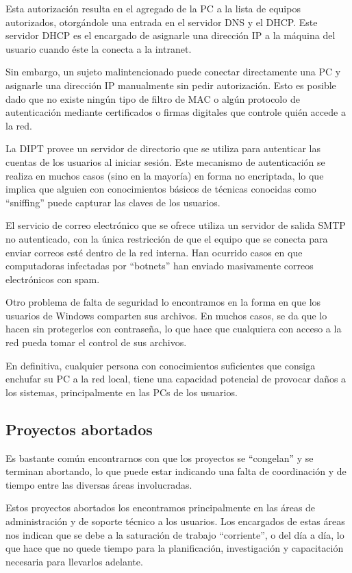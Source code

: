 \documentclass[a4paper,11pt,oneside]{article}
\begin{document}
Esta autorización resulta en el agregado de la PC a la lista de equipos autorizados, otorgándole una entrada
en el servidor DNS y el DHCP. Este servidor DHCP es el encargado de asignarle una dirección IP a la máquina
del usuario cuando éste la conecta a la intranet.

Sin embargo, un sujeto malintencionado puede conectar directamente una
PC y asignarle una dirección IP manualmente sin pedir
autorización. Esto es posible dado que no existe ningún tipo de filtro
de MAC o algún protocolo de autenticación mediante certificados o
firmas digitales que controle quién accede a la red.

La DIPT provee un servidor de directorio  que se utiliza
para autenticar las cuentas de los usuarios al iniciar sesión. Este
mecanismo de autenticación se realiza en muchos casos (sino en la
mayoría) en forma no encriptada, lo que implica que alguien con
conocimientos básicos de técnicas conocidas como ``sniffing'' puede
capturar las claves de los usuarios.

El servicio de correo electrónico que se ofrece utiliza un servidor de
salida SMTP no autenticado, con la única restricción de que el equipo
que se conecta para enviar correos esté dentro de la red interna. Han
ocurrido casos en que computadoras infectadas por ``botnets'' han
enviado masivamente correos electrónicos con spam.

Otro problema de falta de seguridad lo encontramos en la forma en que
los usuarios de Windows comparten sus archivos. En muchos casos, se da
que lo hacen sin protegerlos con contraseña, lo que hace que
cualquiera con acceso a la red pueda tomar el control de sus archivos.

En definitiva, cualquier persona con conocimientos suficientes que
consiga enchufar su PC a la red local, tiene una capacidad
potencial de provocar daños a los sistemas, principalmente en las PCs
de los usuarios.
%
\subsection*{Proyectos abortados}
Es bastante común encontrarnos con que los proyectos se ``congelan'' y
se terminan abortando, lo que puede estar indicando una falta de
coordinación y de tiempo entre las diversas áreas involucradas.

Estos proyectos abortados los encontramos principalmente en las áreas
de administración y de soporte técnico a los usuarios. Los encargados
de estas áreas nos indican que se debe a la saturación de trabajo
``corriente'', o del día a día, lo que hace que no quede tiempo para
la planificación, investigación y capacitación necesaria para
llevarlos adelante.
\end{document}
